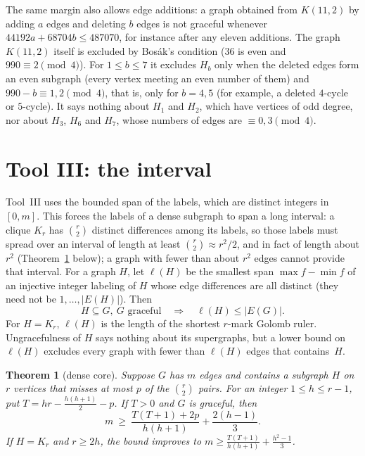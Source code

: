 \documentclass[11pt]{amsart}
\newcommand{\thmmarker}{}
\newcommand{\mgpt}{\gdef\thmmarker{\textsuperscript{$\dagger$}}}
\theoremstyle{tplain}
\newtheorem{theorem}{Theorem}[section]
\theoremstyle{tdefinition}
\theoremstyle{tremark}
\begin{document}
The same margin also allows edge additions: a graph obtained from
$K(11,2)$ by adding $a$ edges and deleting $b$ edges is not graceful whenever
$44192a+68704b\le487070$, for instance after any eleven additions. The graph
$K(11,2)$ itself is excluded by Bos\'ak's condition ($36$ is even and
$990\equiv2\pmod4$). For $1\le b\le7$ it excludes $H_b$ only when the deleted
edges form an even subgraph (every vertex meeting an even number of them) and
$990-b\equiv1,2\pmod4$, that is, only for $b=4,5$ (for example, a deleted
$4$-cycle or $5$-cycle). It says nothing about $H_1$ and $H_2$, which have
vertices of odd degree, nor about $H_3$, $H_6$ and $H_7$, whose numbers of
edges are $\equiv0,3\pmod4$.

\section{Tool III: the interval}\label{sec:interval}

Tool~III uses the bounded span of the labels, which are distinct integers
in $[0,m]$. This forces the labels of a dense subgraph to span a long interval: a clique $K_r$ has $\binom r2$
distinct differences among its labels, so those labels must spread over an
interval of length at least $\binom r2\approx r^2/2$, and in fact of length
about $r^2$ (Theorem~\ref{thm:core} below); a graph with fewer than about
$r^2$ edges cannot provide that interval. For a graph $H$, let $\ell(H)$ be
the smallest span $\max f-\min f$ of an injective integer labeling of $H$ whose
edge differences are all distinct (they need not be $1,\dots,|E(H)|$). Then
\begin{equation}\label{eq:span}
  H\subseteq G,\ G\text{ graceful}\quad\Longrightarrow\quad\ell(H)\le|E(G)| .
\end{equation}
For $H=K_r$, $\ell(H)$ is the length of the shortest $r$-mark Golomb ruler. Ungracefulness of $H$ says nothing about its supergraphs, but a lower bound
on $\ell(H)$ excludes every graph with fewer than $\ell(H)$ edges that
contains~$H$.

\mgpt\begin{theorem}[dense core]\label{thm:core}
Suppose $G$ has $m$ edges and contains a subgraph $H$ on $r$ vertices that
misses at most $p$ of the $\binom r2$ pairs. For an integer $1\le h\le r-1$,
put $T=hr-\frac{h(h+1)}2-p$. If $T>0$ and $G$ is graceful, then
\[
  m\ \ge\ \frac{T(T+1)+2p}{h(h+1)}+\frac{2(h-1)}3 .
\]
If $H=K_r$ and $r\ge2h$, the bound improves to
$m\ge\frac{T(T+1)}{h(h+1)}+\frac{h^2-1}3$.
\end{theorem}
\end{document}

